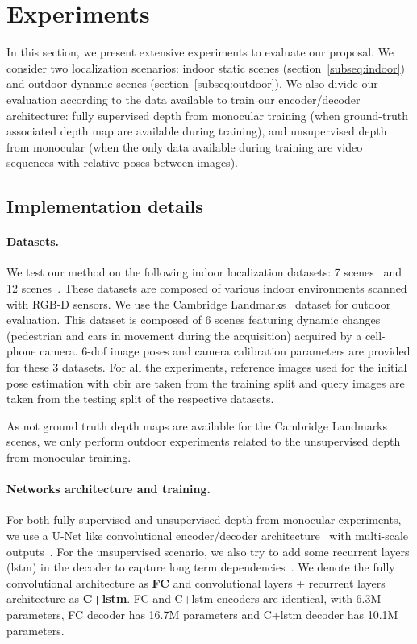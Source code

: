 \section{Experiments}
\label{seq:results}

In this section, we present extensive experiments to evaluate our proposal. We consider two localization scenarios: indoor static scenes (section~\ref{subseq:indoor}) and outdoor dynamic scenes (section~\ref{subseq:outdoor}). We also divide our evaluation according to the data available to train our encoder/decoder architecture: fully supervised depth from monocular training (when ground-truth associated depth map are available during training), and unsupervised depth from monocular (when the only data available during training are video sequences with relative poses between images).

\subsection{Implementation details}
\label{subseq:implementation}

\paragraph{Datasets.} We test our method on the following indoor localization datasets: 7 scenes~\citep{Shotton2013} and 12 scenes~\citep{Valentin2016}. These datasets are composed of various indoor environments scanned with RGB-D sensors. We use the Cambridge Landmarks~\citep{Kendall2015} dataset for outdoor evaluation. This dataset is composed of 6 scenes featuring dynamic changes (pedestrian and cars in movement during the acquisition) acquired by a cell-phone camera. 6-\ac{dof} image poses and camera calibration parameters are provided for these 3 datasets. For all the experiments, reference images used for the initial pose estimation with \ac{cbir} are taken from the training split and query images are taken from the testing split of the respective datasets.

As not ground truth depth maps are available for the Cambridge Landmarks scenes, we only perform outdoor experiments related to the unsupervised depth from monocular training.

\paragraph{Networks architecture and training.} For both fully supervised and unsupervised depth from monocular experiments, we use a U-Net like convolutional encoder/decoder architecture~\citep{Isola2017} with multi-scale outputs~\citep{Godard2017}. For the unsupervised scenario, we also try to add some recurrent layers (\ac{lstm}) in the decoder to capture long term dependencies~\citep{Visin2015, Li2016b}. We denote the fully convolutional architecture as \textbf{FC} and convolutional layers + recurrent layers architecture as \textbf{C+\ac{lstm}}. FC and C+\ac{lstm} encoders are identical, with 6.3M parameters, FC decoder has 16.7M parameters and C+\ac{lstm} decoder has 10.1M parameters.

